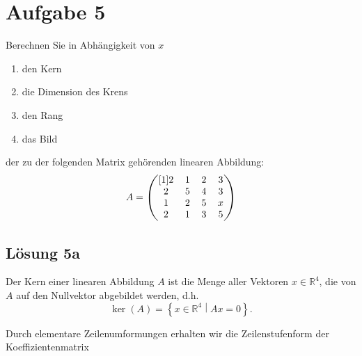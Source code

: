 \documentclass[main.tex]{subfiles}
\begin{document}
\section{Aufgabe 5}
Berechnen Sie in Abhängigkeit von $x$

\begin{enumerate}
    \item den Kern
    \item die Dimension des Krens
    \item den Rang
    \item das Bild
\end{enumerate}
der zu der folgenden Matrix gehörenden linearen Abbildung:
$$
    \arraycolsep=0.6em
    A = \begin{pmatrix}[1]
        2 & 1 & 2 & 3 \\
        2 & 5 & 4 & 3 \\
        1 & 2 & 5 & x \\
        2 & 1 & 3 & 5
    \end{pmatrix}
$$

\subsection{Lösung 5a}

Der Kern einer linearen Abbildung $A$ ist die Menge aller Vektoren $x \in \mathbb{R}^4$, die von $A$ auf den Nullvektor abgebildet werden, d.h.
$$
    \ker (A) = \left\{ x\in \mathbb{R}^4 \middle| Ax=0 \right\}.
$$

Durch elementare Zeilenumformungen erhalten wir die Zeilenstufenform der Koeffizientenmatrix
\end{document}
